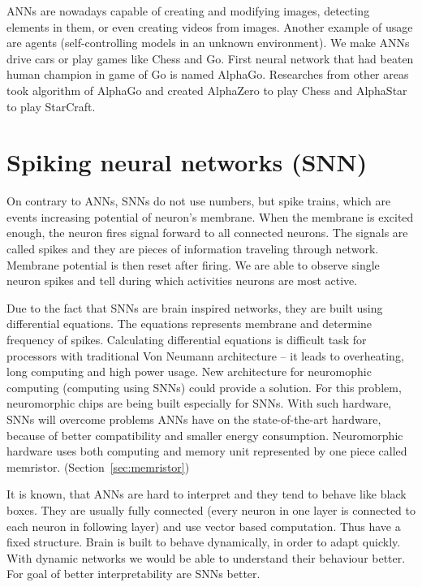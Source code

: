 ANNs are nowadays capable of creating and modifying images, detecting elements in them, or even creating videos from images. Another example of usage are agents (self-controlling models in an unknown environment). We make ANNs drive cars or play games like Chess and Go. First neural network that had beaten human champion in game of Go is named AlphaGo. Researches from other areas took algorithm of AlphaGo and created AlphaZero to play Chess and AlphaStar to play StarCraft.

%
%

\section{Spiking neural networks (SNN)}
\label{sec:spiking_nn}

On contrary to ANNs, SNNs do not use numbers, but spike trains, which are events increasing potential of neuron's membrane. When the membrane is excited enough, the neuron fires signal forward to all connected neurons. The signals are called spikes and they are pieces of information traveling through network. Membrane potential is then reset after firing. We are able to observe single neuron spikes and tell during which activities neurons are most active.

Due to the fact that SNNs are brain inspired networks, they are built using differential equations. The equations represents membrane and determine frequency of spikes. \cite{snns-nextgen} Calculating differential equations is difficult task for processors with traditional Von Neumann architecture -- it leads to overheating, long computing and high power usage. New architecture for neuromophic computing (computing using SNNs) could provide a solution. For this problem, neuromorphic chips are being built especially for SNNs. With such hardware, SNNs will overcome problems ANNs have on the state-of-the-art hardware, because of better compatibility and smaller energy consumption. Neuromorphic hardware uses both computing and memory unit represented by one piece called memristor. (Section~\ref{sec:memristor})

It is known, that ANNs are hard to interpret and they tend to behave like black boxes. They are usually fully connected (every neuron in one layer is connected to each neuron in following layer) and use vector based computation. Thus have a fixed structure. Brain is built to behave dynamically, in order to adapt quickly. With dynamic networks we would be able to understand their behaviour better. For goal of better interpretability are SNNs better. \cite{neucube}

